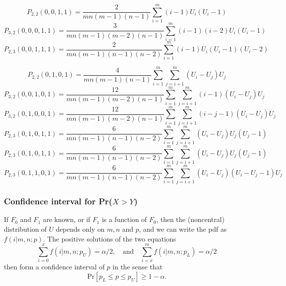 \begin{equation}
	P_{2,2}(0,0,1,1) = \frac{2}{mn(m-1)(n-1)} \sum_{i=1}^m (i-1)U_i(U_i-1)
\end{equation}
\begin{equation}
	P_{3,2}(0,0,0,1,1) = \frac{3}{mn(m-1)(m-2)(n-1)} \sum_{i=1}^m (i-1)(i-2)U_i(U_i-1)
\end{equation}
\begin{equation}
	P_{2,3}(0,0,1,1,1) = \frac{2}{mn(m-1)(n-1)(n-2)} \sum_{i=1}^m (i-1)U_i(U_i-1)(U_i-2)
\end{equation}

\begin{equation}
	P_{2,2}(0,1,0,1) = \frac{4}{mn(m-1)(n-1)} \sum_{i=1}^m  \sum_{j=i+1}^m (U_i - U_j) U_j
\end{equation}
\begin{equation}
	P_{3,2}(0,0,1,0,1) = \frac{12}{mn(m-1)(m-2)(n-1)} \sum_{i=1}^m  \sum_{j=i+1}^m (i-1)(U_i - U_j) U_j
\end{equation}
\begin{equation}
	P_{3,2}(0,1,0,0,1) = \frac{12}{mn(m-1)(m-2)(n-1)} \sum_{i=1}^m  \sum_{j=i+1}^m (i-j-1)(U_i - U_j) U_j
\end{equation}
\begin{equation}
	P_{2,3}(0,1,0,1,1) = \frac{6}{mn(m-1)(n-1)(n-2)} \sum_{i=1}^m  \sum_{j=i+1}^m (U_i - U_j) U_j (U_j-1)
\end{equation}
\begin{equation}
	P_{2,3}(0,1,0,1,1) = \frac{6}{mn(m-1)(n-1)(n-2)} \sum_{i=1}^m  \sum_{j=i+1}^m (U_i - U_j) U_j (U_j - 1)
\end{equation}
\begin{equation}
	P_{2,3}(0,1,1,0,1) = \frac{6}{mn(m-1)(n-1)(n-2)} \sum_{i=1}^m  \sum_{j=i+1}^m (U_i - U_j) (U_i - U_j - 1) U_j 
\end{equation}


\subsubsection{Confidence interval for Pr($X>Y$)}
If $F_0$ and $F_1$ are known, or if $F_1$ is a function of $F_0$, then the (noncentral) distribution of $U$ depends only on $m,n$ and $p$, and we can write the pdf as $f(i \vert m,n;p)$. The positive solutions of the two equations 
\begin{equation}
	\sum_{i=0}^x f(i \vert m,n;p_U) = \alpha/2, \quad \text{and} \quad \sum_{i=x}^m f(i \vert m,n;p_L) = \alpha/2
\end{equation}
then form a confidence interval of $p$ in the sense that
\begin{equation}
	\text{Pr}[p_L \leq p \leq p_U ] \geq 1 - \alpha.
\end{equation}






